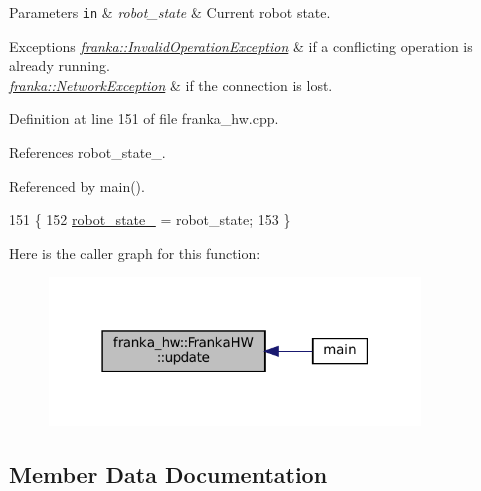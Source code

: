 \begin{DoxyParams}[1]{Parameters}
\mbox{\tt in}  & {\em robot\+\_\+state} & Current robot state.\\
\hline
\end{DoxyParams}

\begin{DoxyExceptions}{Exceptions}
{\em \hyperlink{structfranka_1_1InvalidOperationException}{franka\+::\+Invalid\+Operation\+Exception}} & if a conflicting operation is already running. \\
\hline
{\em \hyperlink{structfranka_1_1NetworkException}{franka\+::\+Network\+Exception}} & if the connection is lost. \\
\hline
\end{DoxyExceptions}


Definition at line 151 of file franka\+\_\+hw.\+cpp.



References robot\+\_\+state\+\_\+.



Referenced by main().


\begin{DoxyCode}
151                                                          \{
152   \hyperlink{classfranka__hw_1_1FrankaHW_a1b9c3149cda8b7d78d52ecea65a8ebab}{robot\_state\_} = robot\_state;
153 \}
\end{DoxyCode}
Here is the caller graph for this function\+:
\nopagebreak
\begin{figure}[H]
\begin{center}
\leavevmode
\includegraphics[width=279pt]{classfranka__hw_1_1FrankaHW_ad8f348151b93a7eebc9ef45a702a29ee_icgraph}
\end{center}
\end{figure}


\subsection{Member Data Documentation}
\mbox{\label{classfranka__hw_1_1FrankaHW_acb16f326973e2eb1c33c28f71492d7d5}} 
